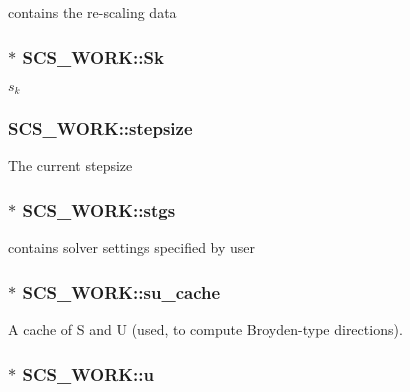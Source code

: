 contains the re-\/scaling data \hypertarget{struct_s_c_s___w_o_r_k_a7cca350a27cb51159173625c33c612a8}{
\subsubsection[{Sk}]{$\ast$ S\-C\-S\-\_\-\-W\-O\-R\-K\-::\-Sk}}\label{struct_s_c_s___w_o_r_k_a7cca350a27cb51159173625c33c612a8}
$s_k$ \hypertarget{struct_s_c_s___w_o_r_k_ac5a727ef1efb0420f4cffa873f30eacd}{
\subsubsection[{stepsize}]{ S\-C\-S\-\_\-\-W\-O\-R\-K\-::stepsize}}\label{struct_s_c_s___w_o_r_k_ac5a727ef1efb0420f4cffa873f30eacd}
The current stepsize \hypertarget{struct_s_c_s___w_o_r_k_a4f48ab97dacf5c54b250752d2213c83c}{
\subsubsection[{stgs}]{$\ast$ S\-C\-S\-\_\-\-W\-O\-R\-K\-::stgs}}\label{struct_s_c_s___w_o_r_k_a4f48ab97dacf5c54b250752d2213c83c}
contains solver settings specified by user \hypertarget{struct_s_c_s___w_o_r_k_a868a7451f64464b0f2c6c053073998ed}{
\subsubsection[{su\-\_\-cache}]{$\ast$ S\-C\-S\-\_\-\-W\-O\-R\-K\-::su\-\_\-cache}}\label{struct_s_c_s___w_o_r_k_a868a7451f64464b0f2c6c053073998ed}
A cache of {\ttfamily S} and {\ttfamily U} (used, to compute Broyden-\/type directions). \hypertarget{struct_s_c_s___w_o_r_k_a991bc82cd3e84ce1ac7d3625b051a577}{
\subsubsection[{u}]{$\ast$ S\-C\-S\-\_\-\-W\-O\-R\-K\-::u}}\label{struct_s_c_s___w_o_r_k_a991bc82cd3e84ce1ac7d3625b051a577}
